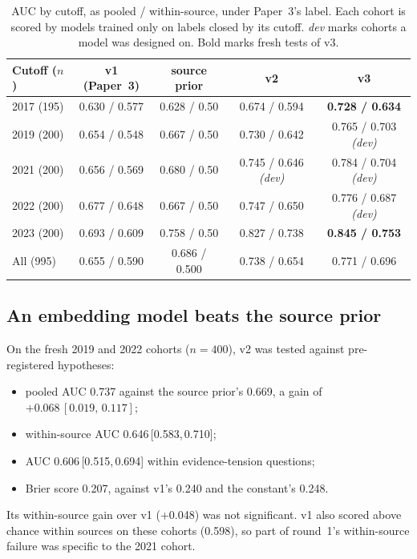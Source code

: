 \documentclass[11pt]{article}
\newcommand{\ci}[2]{\,[#1,\,#2]}
\begin{document}
\begin{table}[t]
\centering
\caption{AUC by cutoff, as pooled / within-source, under Paper~3's label. Each
cohort is scored by models trained only on labels closed by its cutoff.
\emph{dev} marks cohorts a model was designed on. Bold marks fresh tests of v3.}
\label{tab:cutoffs}
\small
\begin{tabular}{@{}lcccc@{}}
\toprule
Cutoff ($n$) & v1 (Paper~3) & source prior & v2 & v3 \\
\midrule
2017 (195) & 0.630 / 0.577 & 0.628 / 0.50 & 0.674 / 0.594 & \textbf{0.728 / 0.634} \\
2019 (200) & 0.654 / 0.548 & 0.667 / 0.50 & 0.730 / 0.642 & 0.765 / 0.703 \emph{(dev)} \\
2021 (200) & 0.656 / 0.569 & 0.680 / 0.50 & 0.745 / 0.646 \emph{(dev)} & 0.784 / 0.704 \emph{(dev)} \\
2022 (200) & 0.677 / 0.648 & 0.667 / 0.50 & 0.747 / 0.650 & 0.776 / 0.687 \emph{(dev)} \\
2023 (200) & 0.693 / 0.609 & 0.758 / 0.50 & 0.827 / 0.738 & \textbf{0.845 / 0.753} \\
\midrule
All (995) & 0.655 / 0.590 & 0.686 / 0.500 & 0.738 / 0.654 & 0.771 / 0.696 \\
\bottomrule
\end{tabular}
\end{table}

\subsection{An embedding model beats the source prior}\label{sec:r2}

On the fresh 2019 and 2022 cohorts ($n=400$), v2 was tested against
pre-registered hypotheses:
\begin{itemize}
\item pooled AUC 0.737 against the source prior's 0.669, a gain of
  $+0.068\ci{0.019}{0.117}$;
\item within-source AUC 0.646\ci{0.583}{0.710};
\item AUC 0.606\ci{0.515}{0.694} within evidence-tension questions;
\item Brier score 0.207, against v1's 0.240 and the constant's 0.248.
\end{itemize}
Its within-source gain over v1 (+0.048) was not significant. v1 also scored
above chance within sources on these cohorts (0.598), so part of round~1's
within-source failure was specific to the 2021 cohort.
\end{document}
